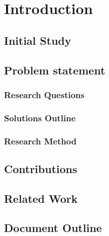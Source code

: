 \chapter{Introduction}\label{Introduction}

\section{Initial Study}\label{Initial Study}

\section{Problem statement}\label{Problem statement}

\subsection{Research Questions}\label{Research Questions}

\subsection{Solutions Outline}\label{Solutions Outline}

\subsection{Research Method}\label{Research Method}

\section{Contributions}\label{Contributions}

\section{Related Work}\label{Related Work}

\section{Document Outline}\label{Document Outline}